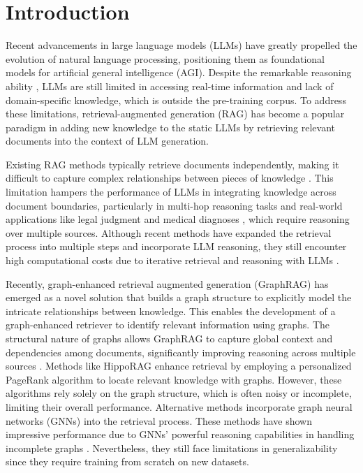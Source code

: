 \section{Introduction}\label{sec:introduction}


Recent advancements in large language models (LLMs) \cite{gpt4o,llama3,qwen2} have greatly propelled the evolution of natural language processing, positioning them as foundational models for artificial general intelligence (AGI). Despite the remarkable reasoning ability \cite{openai_o1}, LLMs are still limited in accessing real-time information and lack of domain-specific knowledge, which is outside the pre-training corpus. To address these limitations, retrieval-augmented generation (RAG) \cite{gao2023retrieval} has become a popular paradigm in adding new knowledge to the static LLMs by retrieving relevant documents into the context of LLM generation. 

Existing RAG methods typically retrieve documents independently, making it difficult to capture complex relationships between pieces of knowledge \cite{karpukhin2020dense,bge_m3,moreira2024nv}. This limitation hampers the performance of LLMs in integrating knowledge across document boundaries, particularly in multi-hop reasoning tasks \cite{yang2018hotpotqa,trivedi2022musique} and real-world applications like legal judgment \cite{kang2024bridging} and medical diagnoses \cite{jin-etal-2019-pubmedqa}, which require reasoning over multiple sources. Although recent methods have expanded the retrieval process into multiple steps and incorporate LLM reasoning, they still encounter high computational costs due to iterative retrieval and reasoning with LLMs \cite{trivedi2023interleaving,sunthink,joshi2024reaper}.

Recently, graph-enhanced retrieval augmented generation (GraphRAG) \cite{peng2024graph,han2024retrieval} has emerged as a novel solution that builds a graph structure to explicitly model the intricate relationships between knowledge. This enables the development of a graph-enhanced retriever to identify relevant information using graphs. The structural nature of graphs allows GraphRAG to capture global context and dependencies among documents, significantly improving reasoning across multiple sources \cite{edge2024local}. 
Methods like HippoRAG \cite{gutiérrez2024hipporag} enhance retrieval by employing a personalized PageRank algorithm to locate relevant knowledge with graphs. However, these algorithms rely solely on the graph structure, which is often noisy or incomplete, limiting their overall performance.
Alternative methods \cite{mavromatis2024gnn,he2024g} incorporate graph neural networks (GNNs) into the retrieval process. These methods have shown impressive performance due to GNNs' powerful reasoning capabilities in handling incomplete graphs \cite{galkintowards}. Nevertheless, they still face limitations in generalizability since they require training from scratch on new datasets.

